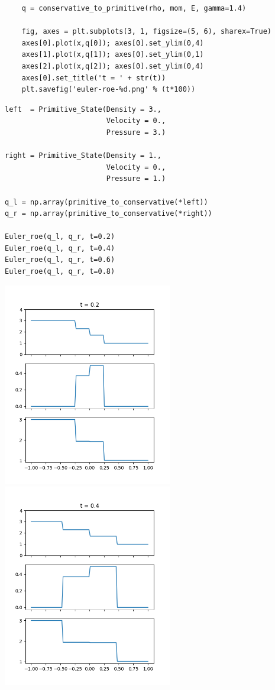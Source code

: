 \documentclass[12pt,fleqn]{article}\usepackage{../../common}
\begin{document}
\begin{verbatim}
    q = conservative_to_primitive(rho, mom, E, gamma=1.4)

    fig, axes = plt.subplots(3, 1, figsize=(5, 6), sharex=True)
    axes[0].plot(x,q[0]); axes[0].set_ylim(0,4)
    axes[1].plot(x,q[1]); axes[0].set_ylim(0,1)
    axes[2].plot(x,q[2]); axes[0].set_ylim(0,4)
    axes[0].set_title('t = ' + str(t))
    plt.savefig('euler-roe-%d.png' % (t*100))    
\end{verbatim}

\begin{verbatim}    
left  = Primitive_State(Density = 3.,
                        Velocity = 0.,
                        Pressure = 3.)

right = Primitive_State(Density = 1.,
                        Velocity = 0.,
                        Pressure = 1.)

q_l = np.array(primitive_to_conservative(*left))
q_r = np.array(primitive_to_conservative(*right))

Euler_roe(q_l, q_r, t=0.2)
Euler_roe(q_l, q_r, t=0.4)
Euler_roe(q_l, q_r, t=0.6)
Euler_roe(q_l, q_r, t=0.8)
\end{verbatim}

\includegraphics[width=20em]{euler-roe-20.png}
\includegraphics[width=20em]{euler-roe-40.png}
\end{document}

